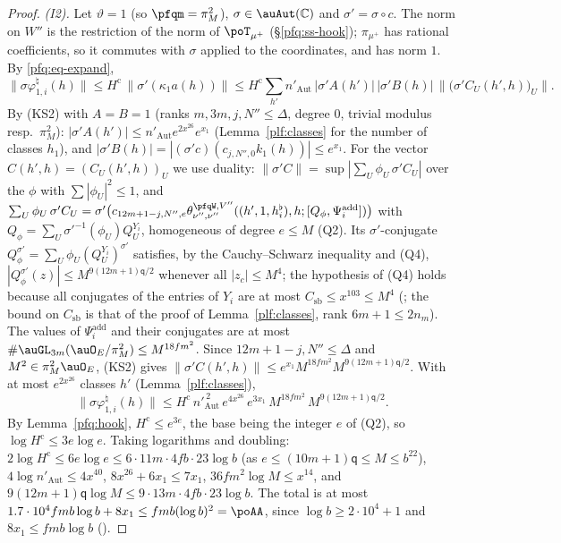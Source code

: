 \documentclass[10pt]{amsart}
\theoremstyle{definition}
\theoremstyle{remark}
\newcommand{\C}{\mathbb C}
\begin{document}
\begin{proof}
\emph{(I2).} Let $\vartheta=1$ (so $\pfqm=\pi_M^2$), $\sigma\in\auAut(\C)$ and $\sigma'=\sigma\circ c$. The norm on $W''$ is the
restriction of the norm of $\poT_{\mu^+}$ (\S\ref{pfq:ss-hook}); $\pi_{\mu^+}$ has rational coefficients, so it commutes with
$\sigma$ applied to the coordinates, and has norm $1$. By \eqref{pfq:eq-expand},
\[
\|\sigma\varphi^\natural_{1,i}(h)\|\le H^{\mathrm c}\,\|\sigma'(\kappa_1a(h))\|\le H^{\mathrm c}\sum_{h'}n'_{\mathrm{Aut}}\,|\sigma'A(h')|\,
|\sigma'B(h)|\,\bigl\|\bigl(\sigma'C_U(h',h)\bigr)_U\bigr\| .
\]
By (KS2) with $A=B=1$ (ranks $m,3m,j,N''\le\Delta$, degree $0$, trivial modulus resp.\ $\pi_M^2$): $|\sigma'A(h')|\le n'_{\mathrm{Aut}}
e^{2x^{26}}e^{x_1}$ (Lemma~\ref{plf:classes} for the number of classes $h_1$), and $|\sigma'B(h)|=|(\sigma'c)(c_{j,N'',0}k_1(h))|\le
e^{x_1}$. For the vector $C(h',h)=(C_U(h',h))_U$ we use duality: $\|\sigma'C\|=\sup|\sum_U\phi_U\,\sigma'C_U|$ over the $\phi$ with
$\sum|\phi_U|^2\le1$, and $\sum_U\phi_U\,\sigma'C_U=\sigma'\bigl(c_{12m+1-j,N'',e}\theta^{\pfqW,V''}_{\nu'',\nu''}((h',1,h^\flat_i),h;
[Q_\phi,\Psi^{\mathrm{add}}_i])\bigr)$ with $Q_\phi=\sum_U\sigma'^{-1}(\phi_U)Q^{Y_i}_U$, homogeneous of degree $e\le M$ (Q2). Its
$\sigma'$-conjugate $Q_\phi^{\sigma'}=\sum_U\phi_U(Q^{Y_i}_U)^{\sigma'}$ satisfies, by the Cauchy--Schwarz inequality and (Q4),
$|Q^{\sigma'}_\phi(z)|\le M^{9(12m+1)\mathsf q/2}$ whenever all $|z_c|\le M^4$; the hypothesis of (Q4) holds because all conjugates of
the entries of $Y_i$ are at most $C_{\mathrm{sb}}\le x^{103}\le M^4$ ({\cite[Lemma~14.21]{P46}}; the bound on $C_{\mathrm{sb}}$ is that of
the proof of Lemma~\ref{plf:classes}, rank $6m+1\le2n_m$). The values of $\Psi^{\mathrm{add}}_i$ and their conjugates are at most
$\#\auGL_{3m}(\auO_E/\pi_M^2)\le M^{18fm^2}$. Since $12m+1-j,N''\le\Delta$ and $M^2\in\pi_M^2\auO_E$, (KS2) gives
$\|\sigma'C(h',h)\|\le e^{x_1}M^{18fm^2}M^{9(12m+1)\mathsf q/2}$. With at most $e^{2x^{26}}$ classes $h'$ (Lemma~\ref{plf:classes}),
\[
\|\sigma\varphi^\natural_{1,i}(h)\|\le H^{\mathrm c}\,n'^{\,2}_{\mathrm{Aut}}\,e^{4x^{26}}\,e^{3x_1}\,M^{18fm^2}\,M^{9(12m+1)\mathsf q/2}.
\]
By Lemma~\ref{pfq:hook}, $H^{\mathrm c}\le e^{3e}$, the base being the integer $e$ of (Q2), so $\log H^{\mathrm c}\le3e\log e$. Taking logarithms and doubling: $2\log H^{\mathrm c}\le6e\log e\le6\cdot11m\cdot4fb\cdot23\log b$ (as
$e\le(10m+1)\mathsf q\le M\le b^{22}$), $4\log n'_{\mathrm{Aut}}\le4x^{40}$, $8x^{26}+6x_1\le7x_1$, $36fm^2\log M\le x^{14}$, and
$9(12m+1)\mathsf q\log M\le9\cdot13m\cdot4fb\cdot23\log b$. The total is at most $1.7\cdot10^4fmb\log b+8x_1\le fmb(\log b)^2=\poAA$, since
$\log b\ge2\cdot10^4+1$ and $8x_1\le fmb\log b$ ({\cite[Lemma~13.4 and~(36)]{P46}}).
\end{proof}
\end{document}
